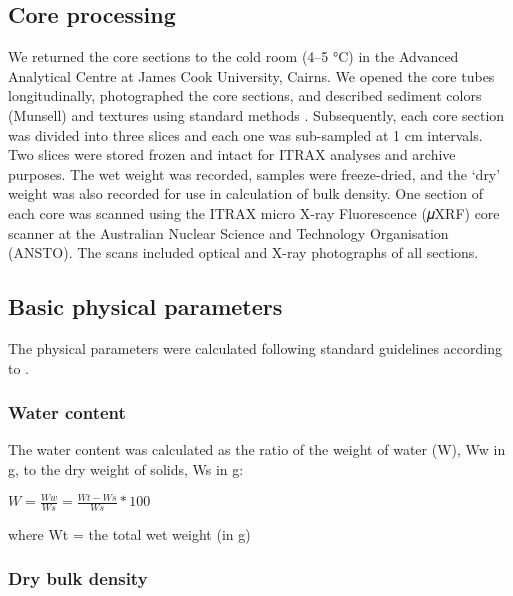 \documentclass[
  12pt,
]{book}
\begin{document}
\hypertarget{core-processing}{%
\subsection{Core processing}\label{core-processing}}

We returned the core sections to the cold room (4--5 °C) in the Advanced Analytical Centre at James Cook University, Cairns. We opened the core tubes longitudinally, photographed the core sections, and described sediment colors (Munsell) and textures using standard methods \citep{schnurrenbergerClassificationLacustrineSediments2003}. Subsequently, each core section was divided into three slices and each one was sub-sampled at 1 cm intervals. Two slices were stored frozen and intact for ITRAX analyses and archive purposes. The wet weight was recorded, samples were freeze-dried, and the `dry' weight was also recorded for use in calculation of bulk density. One section of each core was scanned using the ITRAX micro X-ray Fluorescence (𝜇XRF) core scanner at the Australian Nuclear Science and Technology Organisation (ANSTO). The scans included optical and X-ray photographs of all sections.

\hypertarget{basic-physical-parameters}{%
\subsection{Basic physical parameters}\label{basic-physical-parameters}}

The physical parameters were calculated following standard guidelines according to \citet{hakansonPrinciplesLakeSedimentology1983}.

\hypertarget{water-content}{%
\subsubsection{Water content}\label{water-content}}

The water content was calculated as the ratio of the weight of water (W), Ww in g, to the dry weight of solids, Ws in g:

\(W = \frac{Ww}{Ws} = \frac{Wt-Ws}{Ws}*100\)

where Wt = the total wet weight (in g)

\hypertarget{dry-bulk-density}{%
\subsubsection{Dry bulk density}\label{dry-bulk-density}}
\end{document}
